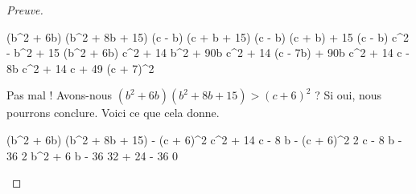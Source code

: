 \begin{proof}[Preuve]
\begin{itemize}
        \medskip
        \noindent\kern-10pt%
        \begin{stepcalc}[style = ar*]
        	(b^2 + 6b) (b^2 + 8b + 15)
        \explnext{}
        	(c - b) (c + b + 15)
        \explnext{}
        	(c - b) (c + b) + 15 (c - b)
        \explnext{}
        	c^2 - b^2 + 15 (b^2 + 6b)
        \explnext{}
        	c^2 + 14 b^2 + 90b
        \explnext{}
        	c^2 + 14 (c - 7b) + 90b
        \explnext{}
        	c^2 + 14 c - 8b
        \explnext[<]{}
        	c^2 + 14 c + 49
        \explnext[<]{}
        	(c + 7)^2
        \end{stepcalc}
        
        \smallskip
        \noindent
        Pas mal ! Avons-nous $(b^2 + 6b) (b^2 + 8b + 15) > (c + 6)^2$ ? Si oui, nous pourrons conclure. Voici ce que cela donne.
    
        \medskip
        \noindent\kern-10pt%
        \begin{stepcalc}[style = ar*]
        	(b^2 + 6b) (b^2 + 8b + 15) - (c + 6)^2
        \explnext{}
        	c^2 + 14 c - 8 b - (c + 6)^2
        \explnext{}
        	2 c - 8 b - 36
        \explnext{}
        	2 b^2 + 6 b - 36
        	32 + 24 - 36
        \explnext[>]{}
        	0
        \end{stepcalc}
    \end{itemize}
    
    \vspace{-2ex}	
    \leavevmode
\end{proof}
